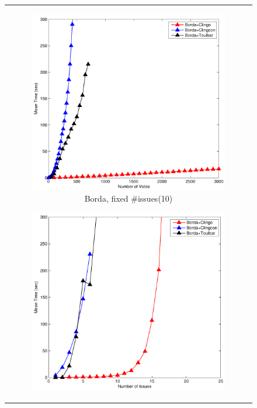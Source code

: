 \begin{figure}[ht!]
	\centering
	\setlength{\tabcolsep}{0mm}
	\begin{tabular}{c}
  \begin{subfigure}[b]{0.44\textwidth}
		\includegraphics[width=\textwidth]{figs/bordaFIMSCICP.pdf}
		\caption{Borda, fixed \#issues(10)}
		\label{fig:comparison:win:1}
	\end{subfigure}
  \begin{subfigure}[b]{0.44\textwidth}
		\includegraphics[width=\textwidth]{figs/bordaFVMSCICP.pdf}

\end{subfigure}
\end{tabular}
\end{figure}
